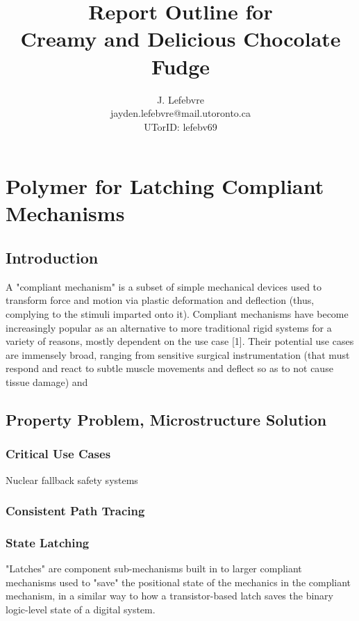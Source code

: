 \documentclass{homework}
\title{Report Outline for \\Creamy and Delicious Chocolate Fudge}
\author{J. Lefebvre\\\small{jayden.lefebvre@mail.utoronto.ca}\\\small{UTorID: lefebv69}}
\begin{document}
\maketitle

\section{Polymer for Latching Compliant Mechanisms}

\subsection{Introduction}

A "compliant mechanism" is a subset of simple mechanical devices used to transform force and motion via plastic deformation and deflection (thus, complying to the stimuli imparted onto it).
Compliant mechanisms have become increasingly popular as an alternative to more traditional rigid systems for a variety of reasons, mostly dependent on the use case [1].
Their potential use cases are immensely broad, ranging from sensitive surgical instrumentation (that must respond and react to subtle muscle movements and deflect so as to not cause tissue damage) and 

\subsection{Property Problem, Microstructure Solution}



\subsubsection{Critical Use Cases}

Nuclear fallback safety systems

\subsubsection{Consistent Path Tracing}



\subsubsection{State Latching}

"Latches" are component sub-mechanisms built in to larger compliant mechanisms used to "save" the positional state of the mechanics in the compliant mechanism, in a similar way to how a transistor-based latch saves the binary logic-level state of a digital system.
\end{document}
